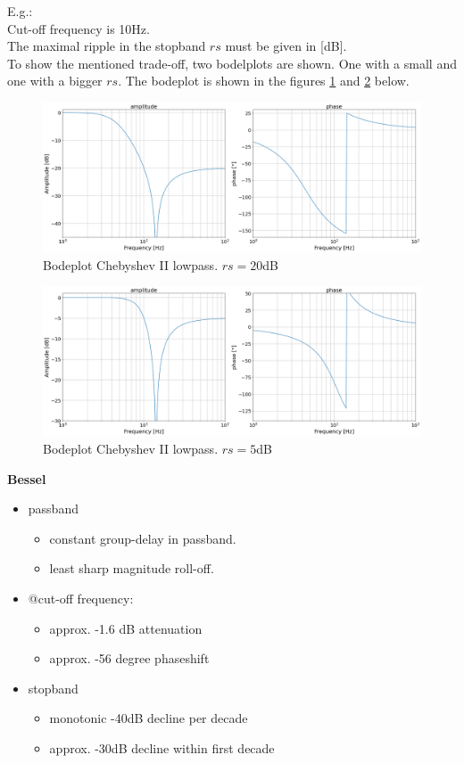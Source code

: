 E.g.: \\
Cut-off frequency is 10Hz.\\
The maximal ripple in the stopband $rs$ must be given in [dB].\\
To show the mentioned trade-off, two bodelplots are shown. One with a small and one with a bigger $rs$.
The bodeplot is shown in the figures \ref{fig:lp_cheby2_1} and \ref{fig:lp_cheby2_2} below.
\begin{figure}[h!]
\centering
  \includegraphics[width=.75\linewidth]{lp_cheby2_20dB.png}
  \caption{Bodeplot Chebyshev II lowpass. $rs=20$dB}
  \label{fig:lp_cheby2_1}
\end{figure}

\begin{figure}[h!]
\centering
  \includegraphics[width=.75\linewidth]{lp_cheby2_5dB.png}
  \caption{Bodeplot Chebyshev II lowpass. $rs=5$dB}
  \label{fig:lp_cheby2_2}
\end{figure}

\textbf{Bessel}\\
\begin{itemize}
    \item passband
    \begin{itemize}
        \item constant group-delay in passband.
		\item least sharp magnitude roll-off.
    \end{itemize}
    \item @cut-off frequency:
    \begin{itemize}
        \item approx. -1.6 dB attenuation
        \item approx. -56 degree phaseshift
    \end{itemize}
    \item stopband 
    \begin{itemize}
        \item monotonic -40dB decline per decade
        \item approx. -30dB decline within first decade
    \end{itemize} 
\end{itemize}

